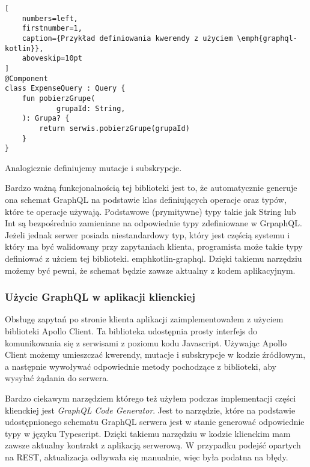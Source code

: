 \begin{addmargin}[6mm]{0mm}
\begin{lstlisting}[
    numbers=left,
    firstnumber=1,
    caption={Przykład definiowania kwerendy z użyciem \emph{graphql-kotlin}},
    aboveskip=10pt
]
@Component
class ExpenseQuery : Query {
    fun pobierzGrupe(
            grupaId: String,
    ): Grupa? {
        return serwis.pobierzGrupe(grupaId)
    }
}
\end{lstlisting}
\end{addmargin}

Analogicznie definiujemy mutacje i subskrypcje.

Bardzo ważną funkcjonalnością tej biblioteki jest to, że automatycznie generuje ona schemat GraphQL na podstawie klas definiujących operacje oraz typów, które te operacje używają. Podstawowe (prymitywne) typy takie jak String lub Int są bezpośrednio zamieniane na odpowiednie typy zdefiniowane w GrpaphQL. Jeżeli jednak serwer posiada niestandardowy typ, który jest częścią systemu i który ma być walidowany przy zapytaniach klienta, programista może takie typy definiować z użciem tej biblioteki. emph{kotlin-graphql}.
Dzięki takiemu narzędziu możemy być pewni, że schemat będzie zawsze aktualny z kodem aplikacyjnym.


\subsubsection{Użycie GraphQL w aplikacji klienckiej}
Obsługę zapytań po stronie klienta aplikacji zaimplementowałem z użyciem biblioteki Apollo Client. Ta biblioteka udostępnia prosty interfejs do komunikowania się z serwisami z poziomu kodu Javascript. Używając Apollo Client możemy umieszczać kwerendy, mutacje i subskrypcje w kodzie źródłowym, a następnie wywoływać odpowiednie metody pochodzące z biblioteki, aby wysyłać żądania do serwera.

Bardzo ciekawym narzędziem którego też użyłem podczas implementacji części klienckiej jest \emph{GraphQL Code Generator}. Jest to narzędzie, które na podstawie udostępnionego schematu GraphQL serwera jest w stanie generować odpowiednie typy w języku Typescript. Dzięki takiemu narzędziu w kodzie klienckim mam zawsze aktualny kontrakt z aplikacją serwerową. W przypadku podejść opartych na REST, aktualizacja odbywała się manualnie, więc była podatna na błędy.

